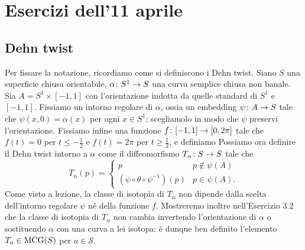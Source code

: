 \section*{Esercizi dell'11 aprile}

\subsection*{Dehn twist}
Per fissare la notazione, ricordiamo come si definiscono i Dehn twist. Siano $S$ una superficie chiusa orientabile, $\map{\alpha}{S^1}{S}$ una curva semplice chiusa non banale. Sia $A=S^1\times[-1,1]$ con l'orientazione indotta da quelle standard di $S^1$ e $[-1,1]$. Fissiamo un intorno regolare di $\alpha$, ossia un embedding $\map{\psi}{A}{S}$ tale che $\psi(x,0)=\alpha(x)$ per ogni $x\in S^1$; scegliamolo in modo che $\psi$ preservi l'orientazione. Fissiamo infine una funzione $\map{f}{[-1,1]}{[0,2\pi]}$ tale che
$f(t)=0$ per $t\le-\frac{1}{2}$ e $f(t)=2\pi$ per $t\ge\frac{1}{2}$, e definiamo
Possiamo ora definire il Dehn twist intorno a $\alpha$ come il diffeomorfismo $\map{T_\alpha}{S}{S}$ tale che
\[
T_\alpha(p)=\begin{cases}
p&p\not\in\psi(A)\\
(\psi\circ\theta\circ\psi^{-1})(p)&p\in\psi(A).
\end{cases}
\]
Come visto a lezione, la classe di isotopia di $T_\alpha$ non dipende dalla scelta dell'intorno regolare $\psi$ né della funzione $f$. Mostreremo inoltre nell'Esercizio 3.2 che la classe di isotopia di $T_\alpha$ non cambia invertendo l'orientazione di $\alpha$ o sostituendo $\alpha$ con una curva a lei isotopa: è dunque ben definito l'elemento $T_a\in\operatorname{MCG}(S)$ per $a\in\mathcal{S}$.

\newpage
